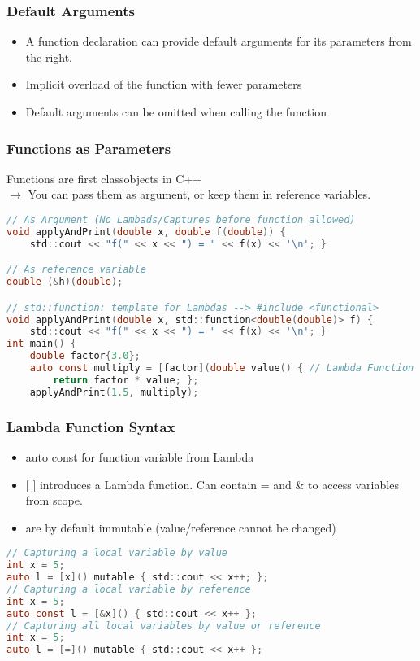 \subsubsection{Default Arguments}
\begin{itemize}
    \item A function declaration can provide default arguments for its parameters from the right.
    \item Implicit overload of the function with fewer parameters
    \item Default arguments can be omitted when calling the function
\end{itemize}

\subsubsection{Functions as Parameters}
Functions are \dq first class\dq objects in C++\\
$\rightarrow$ You can pass them as argument, or keep them in reference variables.

\begin{lstlisting}[style=frame, style= linenumbers, language=C]
// As Argument (No Lambads/Captures before function allowed)
void applyAndPrint(double x, double f(double)) {
    std::cout << "f(" << x << ") = " << f(x) << '\n'; }

// As reference variable
double (&h)(double);

// std::function: template for Lambdas --> #include <functional>
void applyAndPrint(double x, std::function<double(double)> f) {
    std::cout << "f(" << x << ") = " << f(x) << '\n'; }
int main() {
    double factor{3.0};
    auto const multiply = [factor](double value() { // Lambda Function
        return factor * value; };
    applyAndPrint(1.5, multiply);
\end{lstlisting}

\subsubsection{Lambda Function Syntax}
\begin{itemize}
    \item auto const for function variable from Lambda
    \item $[$ $]$ introduces a Lambda function. Can contain = and \& to access variables from scope.
    \item are by default immutable (value/reference cannot be changed)
\end{itemize}
\begin{lstlisting}[style=frame, style= linenumbers, language=C]
// Capturing a local variable by value
int x = 5;
auto l = [x]() mutable { std::cout << x++; };
// Capturing a local variable by reference
int x = 5;
auto const l = [&x]() { std::cout << x++ };
// Capturing all local variables by value or reference
int x = 5;
auto l = [=]() mutable { std::cout << x++ };
\end{lstlisting}

